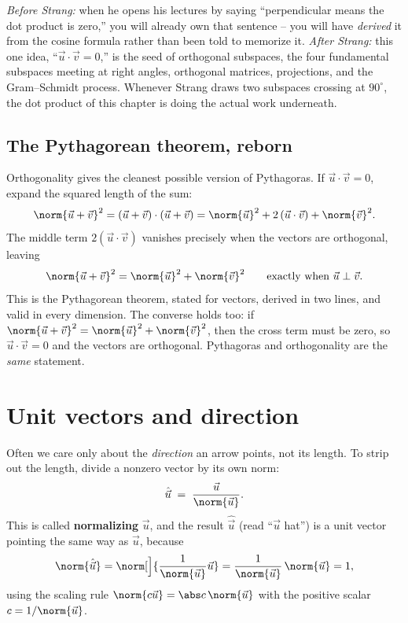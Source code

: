 \begin{strangbox}
\emph{Before Strang:} when he opens his lectures by saying ``perpendicular means
the dot product is zero,'' you will already own that sentence -- you will have
\emph{derived} it from the cosine formula rather than been told to memorize it.
\emph{After Strang:} this one idea, ``$\vec u\cdot\vec v=0$,'' is the seed of
orthogonal subspaces, the four fundamental subspaces meeting at right angles,
orthogonal matrices, projections, and the Gram--Schmidt process. Whenever Strang
draws two subspaces crossing at $90^\circ$, the dot product of this chapter is doing
the actual work underneath.
\end{strangbox}

\subsection{The Pythagorean theorem, reborn}

Orthogonality gives the cleanest possible version of Pythagoras. If
$\vec u\cdot\vec v = 0$, expand the squared length of the sum:
\[
  \norm{\vec u + \vec v}^2
    = (\vec u+\vec v)\cdot(\vec u+\vec v)
    = \norm{\vec u}^2 + 2\,(\vec u\cdot\vec v) + \norm{\vec v}^2.
\]
The middle term $2(\vec u\cdot\vec v)$ vanishes precisely when the vectors are
orthogonal, leaving
\[
  \norm{\vec u + \vec v}^2 = \norm{\vec u}^2 + \norm{\vec v}^2
  \qquad\text{exactly when } \vec u\perp\vec v.
\]
This is the Pythagorean theorem, stated for vectors, derived in two lines, and
valid in every dimension. The converse holds too: if
$\norm{\vec u+\vec v}^2 = \norm{\vec u}^2+\norm{\vec v}^2$, then the cross term must
be zero, so $\vec u\cdot\vec v = 0$ and the vectors are orthogonal. Pythagoras and
orthogonality are the \emph{same} statement.

\section{Unit vectors and direction}

Often we care only about the \emph{direction} an arrow points, not its length. To
strip out the length, divide a nonzero vector by its own norm:
\[
  \hat{\vec u} \;=\; \frac{\vec u}{\norm{\vec u}}.
\]
This is called \textbf{normalizing} $\vec u$, and the result $\hat{\vec u}$ (read
``$\vec u$ hat'') is a unit vector pointing the same way as $\vec u$, because
\[
  \norm{\hat{\vec u}} = \norm[\Big]{\frac{1}{\norm{\vec u}}\vec u}
  = \frac{1}{\norm{\vec u}}\,\norm{\vec u} = 1,
\]
using the scaling rule $\norm{c\vec u}=\abs c\,\norm{\vec u}$ with the positive
scalar $c = 1/\norm{\vec u}$.

